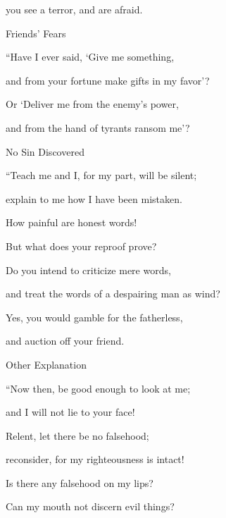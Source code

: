 {\par }{\Q you see
a terror,
and are afraid.
\par }{\SH Friends’ Fears
\par }{\Q {}“Have I ever said, ‘Give
me something,
\par }{\Q and from your fortune make gifts in my favor’?
\par }{\Q {}Or ‘Deliver me from
the enemy’s
power,
\par }{\Q and from the hand
of tyrants
ransom me’?
\par }{\SH No Sin Discovered
\par }{\Q {}“Teach
me and I,
for my part, will be silent;
\par }{\Q explain to me
how
I have been mistaken.
\par }{\Q {}How
painful
are honest
words!
\par }{\Q But what
does
your reproof
prove?
\par }{\Q {}Do you intend to criticize
mere words,
\par }{\Q and treat
the words
of a despairing
man as
wind?
\par }{\Q {}Yes,
you would gamble
for the fatherless,
\par }{\Q and auction
off your friend.
\par }{\SH Other Explanation
\par }{\Q {}“Now
then,
be good enough
to look
at me;

\par }{\Q and I will not
lie
to your face!
\par }{\Q {}Relent,
let
there be
no falsehood;
\par }{\Q reconsider,
for my righteousness is intact!
\par }{\Q {}Is there
any falsehood
on my lips?
\par }{\Q Can
my mouth
not
discern
evil things?

}
